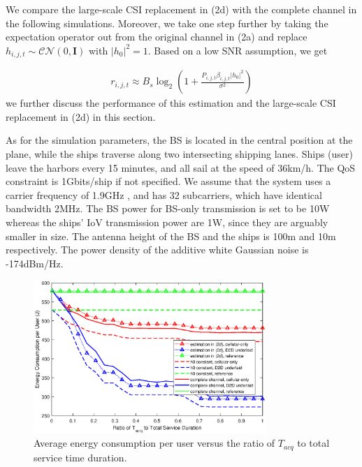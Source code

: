 \documentclass{ieeeaccess}
\begin{document}
We compare the large-scale CSI replacement in (2d) with the complete channel in the following simulations. Moreover, we take one step further by taking the expectation operator out from the original channel in (2a) and replace ${h_{i,j,t}} \sim \mathcal{CN}(0, \mathbf{I})$ with ${\left| {{h_0}} \right|^2} = 1$. Based on a low SNR assumption, we get 

\begin{align}
{r_{i,j,t}} \approx {B_s}{\log _2}\left( {1 + \frac{{{P_{i,j,t}}{\beta _{i,j,t}}{{\left| {{h_0}} \right|}^2}}}{{{\sigma ^2}}}} \right)
\end{align}
we further discuss the performance of this estimation and the large-scale CSI replacement in (2d) in this section.

As for the simulation parameters, the BS is located in the central position at the plane, while the ships traverse along two intersecting shipping lanes.
Ships (user) leave the harbors every 15 minutes, and all sail at the speed of 36km/h. The QoS constraint is 1Gbits/ship if not specified. We assume that the system uses a carrier frequency of 1.9GHz , and has 32 subcarriers, which have identical bandwidth 2MHz. The BS power for BS-only transmission is set to be 10W whereas the ships' IoV transmission power are 1W, since they are arguably smaller in size. The antenna height of the BS and the ships is 100m and 10m respectively. The power density of the additive white Gaussian noise is -174dBm/Hz.


\begin{figure} [htb]
\includegraphics*[width=8.8cm]{Tranges.eps}
\caption{Average energy consumption per user versus the ratio of ${T_{acq}}$ to total service time duration.} \label{fig:4}
\end{figure}
\end{document}
